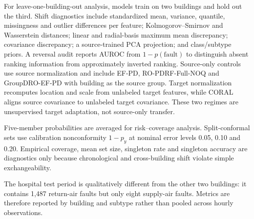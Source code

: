 \documentclass[10pt]{article}
\begin{document}
For leave-one-building-out analysis, models train on two buildings and hold out the third. Shift diagnostics include standardized mean, variance, quantile, missingness and outlier differences per feature; Kolmogorov--Smirnov and Wasserstein distances; linear and radial-basis maximum mean discrepancy; covariance discrepancy; a source-trained PCA projection; and class/subtype priors. A reversal audit reports AUROC from $1-p(\mathrm{fault})$ to distinguish absent ranking information from approximately inverted ranking. Source-only controls use source normalization and include EF-PD, RO-PDRF-Full-NOQ and GroupDRO-EF-PD with building as the source group. Target normalization recomputes location and scale from unlabeled target features, while CORAL aligns source covariance to unlabeled target covariance. These two regimes are unsupervised target adaptation, not source-only transfer.

Five-member probabilities are averaged for risk--coverage analysis. Split-conformal sets use calibration nonconformity $1-p_y$ at nominal error levels 0.05, 0.10 and 0.20. Empirical coverage, mean set size, singleton rate and singleton accuracy are diagnostics only because chronological and cross-building shift violate simple exchangeability.

\begin{table}[ht]
\centering
\caption{Chronological AHU split counts used in the field validation.}
\label{tab:supp-ahu-splits}
\resizebox{0.72\textwidth}{!}{}
\end{table}

\begin{table}[ht]
\centering
\caption{Class and native sensor-fault-subtype distribution in each untouched chronological test period.}
\label{tab:supp-ahu-distribution}
\resizebox{0.72\textwidth}{!}{}
\end{table}

The hospital test period is qualitatively different from the other two buildings: it contains 1,487 return-air faults but only eight supply-air faults. Metrics are therefore reported by building and subtype rather than pooled across hourly observations.

\begin{table}[ht]
\centering
\caption{Detailed chronological AHU results. Values are means across five matched seeds. Fault precision, recall and F1 treat either native temperature-sensor-fault subtype as the positive class.}
\label{tab:supp-ahu-detailed}
\resizebox{\textwidth}{!}{}
\end{table}
\end{document}
